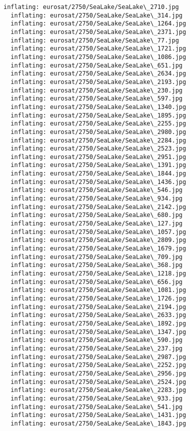 \documentclass[11pt]{article}
\begin{document}
\begin{Verbatim}[commandchars=\\\{\}]
  inflating: eurosat/2750/SeaLake/SeaLake\_2710.jpg
  inflating: eurosat/2750/SeaLake/SeaLake\_314.jpg
  inflating: eurosat/2750/SeaLake/SeaLake\_1264.jpg
  inflating: eurosat/2750/SeaLake/SeaLake\_2371.jpg
  inflating: eurosat/2750/SeaLake/SeaLake\_77.jpg
  inflating: eurosat/2750/SeaLake/SeaLake\_1721.jpg
  inflating: eurosat/2750/SeaLake/SeaLake\_1086.jpg
  inflating: eurosat/2750/SeaLake/SeaLake\_651.jpg
  inflating: eurosat/2750/SeaLake/SeaLake\_2634.jpg
  inflating: eurosat/2750/SeaLake/SeaLake\_2193.jpg
  inflating: eurosat/2750/SeaLake/SeaLake\_230.jpg
  inflating: eurosat/2750/SeaLake/SeaLake\_597.jpg
  inflating: eurosat/2750/SeaLake/SeaLake\_1340.jpg
  inflating: eurosat/2750/SeaLake/SeaLake\_1895.jpg
  inflating: eurosat/2750/SeaLake/SeaLake\_2255.jpg
  inflating: eurosat/2750/SeaLake/SeaLake\_2980.jpg
  inflating: eurosat/2750/SeaLake/SeaLake\_2284.jpg
  inflating: eurosat/2750/SeaLake/SeaLake\_2523.jpg
  inflating: eurosat/2750/SeaLake/SeaLake\_2951.jpg
  inflating: eurosat/2750/SeaLake/SeaLake\_1391.jpg
  inflating: eurosat/2750/SeaLake/SeaLake\_1844.jpg
  inflating: eurosat/2750/SeaLake/SeaLake\_1436.jpg
  inflating: eurosat/2750/SeaLake/SeaLake\_546.jpg
  inflating: eurosat/2750/SeaLake/SeaLake\_934.jpg
  inflating: eurosat/2750/SeaLake/SeaLake\_2142.jpg
  inflating: eurosat/2750/SeaLake/SeaLake\_680.jpg
  inflating: eurosat/2750/SeaLake/SeaLake\_127.jpg
  inflating: eurosat/2750/SeaLake/SeaLake\_1057.jpg
  inflating: eurosat/2750/SeaLake/SeaLake\_2809.jpg
  inflating: eurosat/2750/SeaLake/SeaLake\_1679.jpg
  inflating: eurosat/2750/SeaLake/SeaLake\_709.jpg
  inflating: eurosat/2750/SeaLake/SeaLake\_368.jpg
  inflating: eurosat/2750/SeaLake/SeaLake\_1218.jpg
  inflating: eurosat/2750/SeaLake/SeaLake\_656.jpg
  inflating: eurosat/2750/SeaLake/SeaLake\_1081.jpg
  inflating: eurosat/2750/SeaLake/SeaLake\_1726.jpg
  inflating: eurosat/2750/SeaLake/SeaLake\_2194.jpg
  inflating: eurosat/2750/SeaLake/SeaLake\_2633.jpg
  inflating: eurosat/2750/SeaLake/SeaLake\_1892.jpg
  inflating: eurosat/2750/SeaLake/SeaLake\_1347.jpg
  inflating: eurosat/2750/SeaLake/SeaLake\_590.jpg
  inflating: eurosat/2750/SeaLake/SeaLake\_237.jpg
  inflating: eurosat/2750/SeaLake/SeaLake\_2987.jpg
  inflating: eurosat/2750/SeaLake/SeaLake\_2252.jpg
  inflating: eurosat/2750/SeaLake/SeaLake\_2956.jpg
  inflating: eurosat/2750/SeaLake/SeaLake\_2524.jpg
  inflating: eurosat/2750/SeaLake/SeaLake\_2283.jpg
  inflating: eurosat/2750/SeaLake/SeaLake\_933.jpg
  inflating: eurosat/2750/SeaLake/SeaLake\_541.jpg
  inflating: eurosat/2750/SeaLake/SeaLake\_1431.jpg
  inflating: eurosat/2750/SeaLake/SeaLake\_1843.jpg

\end{Verbatim}
\end{document}
